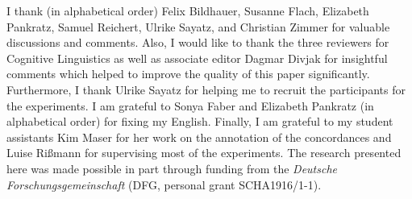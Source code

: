 \documentclass[UKenglish]{article}
\begin{document}









\begin{acknowledgement}
  I thank (in alphabetical order) Felix Bildhauer, Susanne Flach, Elizabeth Pankratz, Samuel Reichert, Ulrike Sayatz, and Christian Zimmer for valuable discussions and comments.
  Also, I would like to thank the three reviewers for Cognitive Linguistics as well as associate editor Dagmar \mbox{Divjak} for insightful comments which helped to improve the quality of this paper significantly.
  Furthermore, I thank Ulrike Sayatz for helping me to recruit the participants for the experiments.
  I am grateful to Sonya Faber and Elizabeth Pankratz (in alphabetical order) for fixing my English.
  Finally, I am grateful to my student assistants Kim Maser for her work on the annotation of the concordances and Luise Rißmann for supervising most of the experiments.
  The research presented here was made possible in part through funding from the \textit{Deutsche Forschungsgemeinschaft} (DFG, personal grant SCHA1916/1-1).
\end{acknowledgement}



\end{document}
